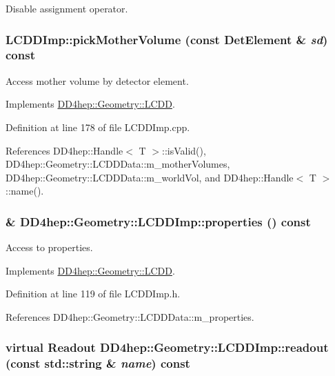 Disable assignment operator. \hypertarget{class_d_d4hep_1_1_geometry_1_1_l_c_d_d_imp_ac46cbee27ebc2412e82455305c54c25f}{
\subsubsection[{pickMotherVolume}]{ LCDDImp::pickMotherVolume (const {\bf DetElement} \& {\em sd}) const}}
\label{class_d_d4hep_1_1_geometry_1_1_l_c_d_d_imp_ac46cbee27ebc2412e82455305c54c25f}


Access mother volume by detector element. 

Implements \hyperlink{class_d_d4hep_1_1_geometry_1_1_l_c_d_d_ad239fb24b7d6eb41abf697f2710ad6a3}{DD4hep::Geometry::LCDD}.

Definition at line 178 of file LCDDImp.cpp.

References DD4hep::Handle$<$ T $>$::isValid(), DD4hep::Geometry::LCDDData::m\_\-motherVolumes, DD4hep::Geometry::LCDDData::m\_\-worldVol, and DD4hep::Handle$<$ T $>$::name().\hypertarget{class_d_d4hep_1_1_geometry_1_1_l_c_d_d_imp_a0b1b69a5950f1780233ff1f1a801a152}{
\subsubsection[{properties}]{\& DD4hep::Geometry::LCDDImp::properties () const}}
\label{class_d_d4hep_1_1_geometry_1_1_l_c_d_d_imp_a0b1b69a5950f1780233ff1f1a801a152}


Access to properties. 

Implements \hyperlink{class_d_d4hep_1_1_geometry_1_1_l_c_d_d_a15fac6166c5a16968cf9f60b515f4125}{DD4hep::Geometry::LCDD}.

Definition at line 119 of file LCDDImp.h.

References DD4hep::Geometry::LCDDData::m\_\-properties.\hypertarget{class_d_d4hep_1_1_geometry_1_1_l_c_d_d_imp_a0ab6375a7cb75751b8f434c06c58d3b2}{
\subsubsection[{readout}]{\setlength{\rightskip}{0pt plus 5cm}virtual {\bf Readout} DD4hep::Geometry::LCDDImp::readout (const std::string \& {\em name}) const}}
\label{class_d_d4hep_1_1_geometry_1_1_l_c_d_d_imp_a0ab6375a7cb75751b8f434c06c58d3b2}


